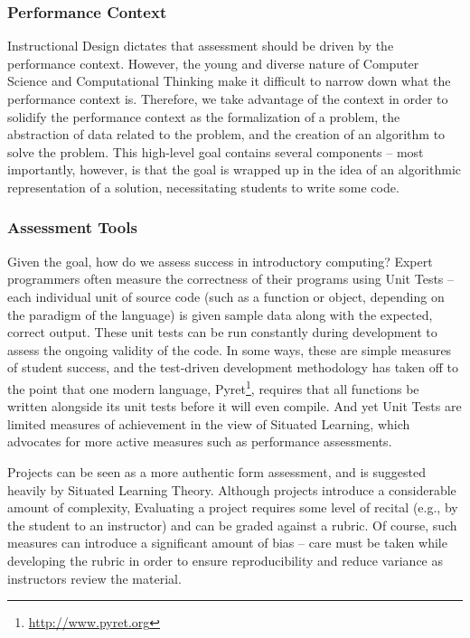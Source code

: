 \subsubsection{Performance Context}

Instructional Design dictates that assessment should be driven by the performance context.
However, the young and diverse nature of Computer Science and Computational Thinking make it difficult to narrow down what the performance context is.
Therefore, we take advantage of the context in order to solidify the performance context as the formalization of a problem, the abstraction of data related to the problem, and the creation of an algorithm to solve the problem.
This high-level goal contains several components -- most importantly, however, is that the goal is wrapped up in the idea of an algorithmic representation of a solution, necessitating students to write some code.

\subsubsection{Assessment Tools}

Given the goal, how do we assess success in introductory computing?
Expert programmers often measure the correctness of their programs using Unit Tests -- each individual unit of source code (such as a function or object, depending on the paradigm of the language) is given sample data along with the expected, correct output.
These unit tests can be run constantly during development to assess the ongoing validity of the code.
In some ways, these are simple measures of student success, and the test-driven development methodology has taken off to the point that one modern language, Pyret\footnote{\url{http://www.pyret.org}}, requires that all functions be written alongside its unit tests before it will even compile.
And yet Unit Tests are limited measures of achievement in the view of Situated Learning, which advocates for more active measures such as performance assessments.

Projects can be seen as a more authentic form assessment, and is suggested heavily by Situated Learning Theory.
Although projects introduce a considerable amount of complexity,
Evaluating a project requires some level of recital (e.g., by the student to an instructor) and can be graded against a rubric.
Of course, such measures can introduce a significant amount of bias -- care must be taken while developing the rubric in order to ensure reproducibility and reduce variance as instructors review the material.

